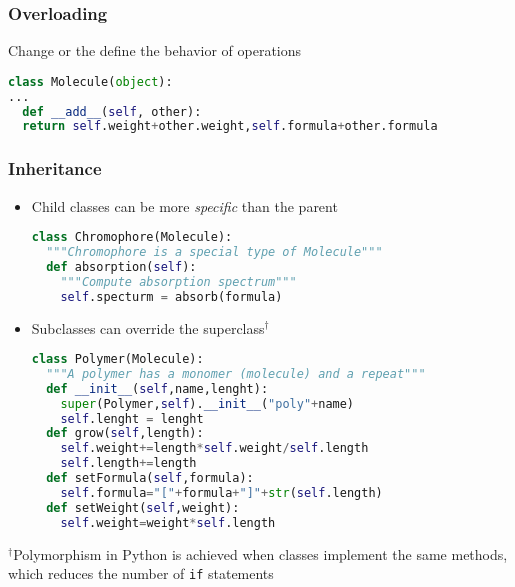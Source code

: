 \documentclass[xcolor=table,10pt,final]{beamer}
\begin{document}
\begin{frame}[fragile]
  \frametitle{Overloading}
  Change or the define the behavior of operations
  \begin{lstlisting}[language=python]
class Molecule(object):
...
  def __add__(self, other):
  return self.weight+other.weight,self.formula+other.formula
  \end{lstlisting}
\end{frame}

\begin{frame}[fragile]
  \frametitle{Inheritance}
  \begin{itemize}
    \item Child classes can be more {\it specific} than the parent\\
      \begin{lstlisting}[language=python]
class Chromophore(Molecule):
  """Chromophore is a special type of Molecule"""
  def absorption(self):
    """Compute absorption spectrum"""
    self.specturm = absorb(formula)
      \end{lstlisting}
    \item Subclasses can override the superclass$^\dagger$\\
  \begin{lstlisting}[language=python]
class Polymer(Molecule):
  """A polymer has a monomer (molecule) and a repeat"""
  def __init__(self,name,lenght):
    super(Polymer,self).__init__("poly"+name)
    self.lenght = lenght
  def grow(self,length):
    self.weight+=length*self.weight/self.length
    self.length+=length
  def setFormula(self,formula):
    self.formula="["+formula+"]"+str(self.length)
  def setWeight(self,weight):
    self.weight=weight*self.length
  \end{lstlisting}
  \end{itemize}
  $^\dagger${\scriptsize Polymorphism in Python is achieved when classes implement the same methods, which reduces the number of {\tt if} statements}
\end{frame}
\end{document}

